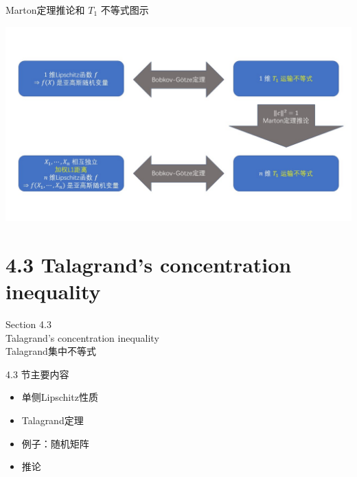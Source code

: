 \documentclass{beamer}
\begin{document}
\begin{frame}{Marton定理推论和 $T_1$ 不等式图示}
\begin{center}
    \includegraphics[width=1.0\textwidth]{figures/structure01.JPG}
\end{center}
\end{frame}

\section{4.3 Talagrand's concentration inequality}

\begin{frame}
\begin{center}
\Large Section 4.3 \\ Talagrand's concentration inequality \\ Talagrand集中不等式
\end{center}
\end{frame}

\begin{frame}{4.3 节主要内容}
\begin{itemize}
    \item 单侧Lipschitz性质
    \item Talagrand定理
    \item 例子：随机矩阵
    \item 推论
\end{itemize}
\end{frame}
\end{document}
